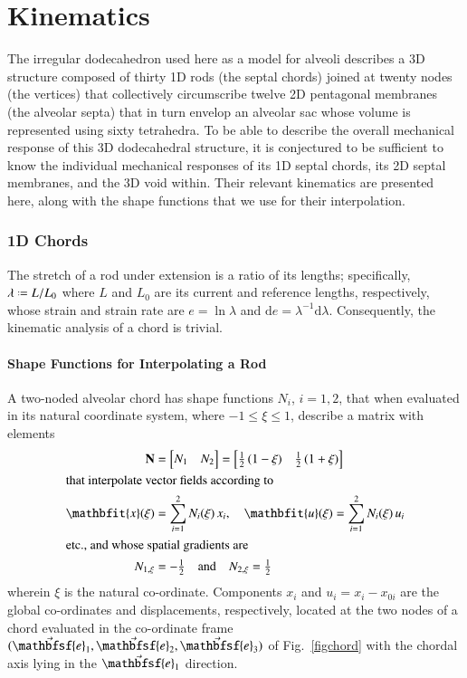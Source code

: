 \part{Kinematics}
\label{partKinematics}

The irregular dodecahedron used here as a model for alveoli describes a 3D structure composed of thirty 1D rods (the septal chords) joined at twenty nodes (the vertices) that collectively circumscribe twelve 2D pentagonal membranes (the alveolar septa) that in turn envelop an alveolar sac whose volume is represented using sixty tetrahedra.  To be able to describe the overall mechanical response of this 3D dodecahedral structure, it is conjectured to be sufficient to know the individual mechanical responses of its 1D septal chords, its 2D septal membranes, and the 3D void within.  Their relevant kinematics are presented here, along with the shape functions that we use for their interpolation.

\section{1D Chords}

The stretch of a rod under extension is a ratio of its lengths; specifically, $\lambda \defeq L / L_0$ where $L$ and $L_0$ are its current and reference lengths, respectively, whose strain and strain rate are $e = \ln \lambda$ and $\mathrm{d} e = \lambda^{-1} \mathrm{d} \lambda$.  Consequently, the kinematic analysis of a chord is trivial.

\subsection{Shape Functions for Interpolating a Rod}

A two-noded alveolar chord has shape functions $N_i$, $i=1,2$, that when evaluated in its natural coordinate system, where $-1 \leq \xi \leq 1$, describe a matrix with elements
\begin{subequations}
    \begin{align}
\mathbf{N} & = \begin{bmatrix} N_1 & N_2 \end{bmatrix} =
\begin{bmatrix}
\frac{1}{2} \, (1 - \xi) &  \frac{1}{2} \, (1 + \xi)
\end{bmatrix} \\
\intertext{that interpolate vector fields according to}
\mathbfit{x} ( \xi ) & = \sum_{i=1}^2 N_i ( \xi ) \, x_i , \quad
\mathbfit{u} ( \xi ) = \sum_{i=1}^2 N_i ( \xi ) \, u_i  \\
\intertext{etc., and whose spatial gradients are} 
N_{1,\xi} & = -\tfrac{1}{2} 
\quad \text{and} \quad
N_{2,\xi} = \tfrac{1}{2}
\end{align}
\end{subequations}
wherein $\xi$ is the natural co-ordinate.  Components $x_i$ and $u_i = x_i - x_{0i}$ are the global co-ordinates and displacements, respectively, located at the two nodes of a chord evaluated in the co-ordinate frame $( \vec{\mathbfsf{e}}_1 , \vec{\mathbfsf{e}}_2 , \vec{\mathbfsf{e}}_3 )$ of Fig.~\ref{figchord} with the chordal axis lying in the $\vec{\mathbfsf{e}}_1$ direction.

